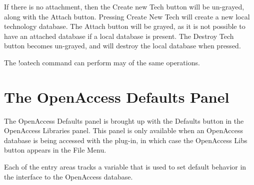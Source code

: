 If there is no attachment, then the {\cb Create new Tech} button will
be un-grayed, along with the {\cb Attach} button.  Pressing {\cb
Create New Tech} will create a new local technology database.  The
{\cb Attach} button will be grayed, as it is not possible to have an
attached database if a local database is present.  The {\cb Destroy
Tech} button becomes un-grayed, and will destroy the local database
when pressed.

The {\cb !oatech} command can perform may of the same operations.
\fi


\ifoa
\section{The {\cb OpenAccess Defaults} Panel}
\label{oadefs}

The {\cb OpenAccess Defaults} panel is brought up with the {\cb
Defaults} button in the {\cb OpenAccess Libraries} panel.  This panel
is only available when an OpenAccess database is being accessed with
the plug-in, in which case the {\cb OpenAccess Libs} button appears in
the {\cb File Menu}.

Each of the entry areas tracks a variable that is used to set default
behavior in the interface to the OpenAccess database.

